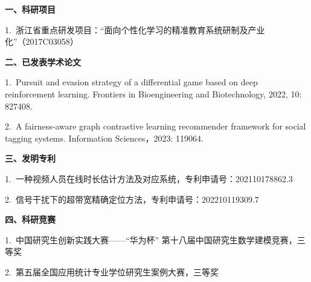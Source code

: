 \cleardoublepage
{}

\noindent {}
\vskip 10pt

\vskip 5pt
\noindent \textbf{一、科研项目}
\vskip 5pt 

1.~浙江省重点研发项目：“面向个性化学习的精准教育系统研制及产业化”（2017C03058）

\vskip 5pt 
\noindent \textbf{二、已发表学术论文}
\vskip 5pt 

1.~Pursuit and evasion strategy of a differential game based on deep reinforcement learning. Frontiers in Bioengineering and Biotechnology, 2022, 10: 827408. 

2.~A fairness-aware graph contrastive learning recommender framework for social tagging systems. Information Sciences，2023: 119064.



\vskip 5pt 
\noindent \textbf{三、发明专利}
\vskip 5pt 

1.~一种视频人员在线时长估计方法及对应系统，专利申请号：202110178862.3

2.~信号干扰下的超带宽精确定位方法，专利申请号：202210119309.7

\vskip 5pt 
\noindent \textbf{四、科研竞赛}
\vskip 5pt 

1.~中国研究生创新实践大赛——“华为杯” 第十八届中国研究生数学建模竞赛，三等奖

2.~第五届全国应用统计专业学位研究生案例大赛，三等奖
\newpage